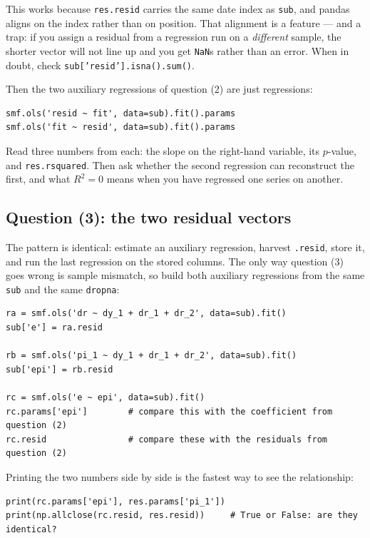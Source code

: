 \documentclass[11pt]{article}
\newcommand{\code}[1]{\texttt{#1}}
\begin{document}
\noindent This works because \code{res.resid} carries the same date index as
\code{sub}, and pandas aligns on the index rather than on position. That
alignment is a feature --- and a trap: if you assign a residual from a regression
run on a \emph{different} sample, the shorter vector will not line up and you
get \code{NaN}s rather than an error. When in doubt, check
\code{sub['resid'].isna().sum()}.

\noindent Then the two auxiliary regressions of question (2) are just
regressions:

\begin{lstlisting}
smf.ols('resid ~ fit', data=sub).fit().params
smf.ols('fit ~ resid', data=sub).fit().params
\end{lstlisting}

\noindent Read three numbers from each: the slope on the right-hand variable,
its $p$-value, and \code{res.rsquared}. Then ask whether the second regression
can reconstruct the first, and what $R^2 = 0$ means when you have regressed one
series on another.

\subsection{Question (3): the two residual vectors}

The pattern is identical: estimate an auxiliary regression, harvest
\code{.resid}, store it, and run the last regression on the stored columns.
The only way question (3) goes wrong is sample mismatch, so build both
auxiliary regressions from the same \code{sub} and the same
\code{dropna}:

\begin{lstlisting}
ra = smf.ols('dr ~ dy_1 + dr_1 + dr_2', data=sub).fit()
sub['e'] = ra.resid

rb = smf.ols('pi_1 ~ dy_1 + dr_1 + dr_2', data=sub).fit()
sub['epi'] = rb.resid

rc = smf.ols('e ~ epi', data=sub).fit()
rc.params['epi']        # compare this with the coefficient from question (2)
rc.resid                # compare these with the residuals from question (2)
\end{lstlisting}

\noindent Printing the two numbers side by side is the fastest way to see the
relationship:

\begin{lstlisting}
print(rc.params['epi'], res.params['pi_1'])
print(np.allclose(rc.resid, res.resid))     # True or False: are they identical?
\end{lstlisting}
\end{document}
